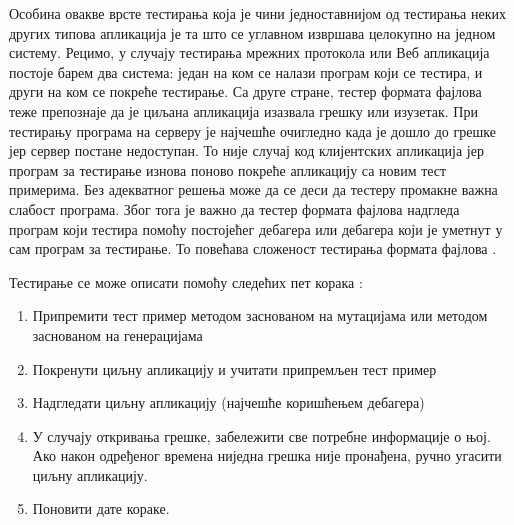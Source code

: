 \documentclass[12pt,oneside]{memoir}
\begin{document}
Особина овакве врсте тестирања која је чини једноставнијом од тестирања неких других типова апликација је та што се углавном извршава целокупно на једном систему. Рецимо, у случају  тестирања мрежних протокола или Веб апликација постоје барем два система: један на ком се налази програм који се тестира, и други на ком се покреће тестирање. Са друге стране, тестер формата фајлова теже препознаје да је циљана апликација изазвала грешку или изузетак. При тестирању програма на серверу је најчешће очигледно када је дошло до грешке јер сервер постане недоступан. То није случај код клијентских апликација јер програм за тестирање изнова поново покреће апликацију са новим тест примерима. Без адекватног решења може да се деси да тестеру промакне важна слабост програма. Због тога је важно да тестер формата фајлова надгледа програм који тестира помоћу постојећег дебагера или дебагера који је уметнут у сам програм за тестирање. То повећава сложеност тестирања формата фајлова \cite{fuzzingBrute, fuzzing}.

Тестирање се може описати помоћу следећих пет корака \cite{fuzzingBrute}:
\begin{enumerate}
\item Припремити тест пример методом заснованом на мутацијама или методом заснованом на генерацијама
\item Покренути циљну апликацију и учитати припремљен тест пример
\item Надгледати циљну апликацију (најчешће коришћењем дебагера)
\item У случају откривања грешке, забележити све потребне информације о њој. Ако након одређеног времена ниједна грешка није пронађена, ручно угасити циљну апликацију. 
\item Поновити дате кораке.
\end{enumerate}
\end{document}
